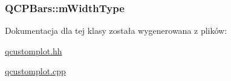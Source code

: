 \subsubsection[{\texorpdfstring{m\+Width\+Type}{mWidthType}}]{ Q\+C\+P\+Bars\+::m\+Width\+Type\hspace{0.3cm}{\ttfamily [protected]}}\hypertarget{class_q_c_p_bars_a94dba1309496c7601d01e2c59715cbb3}{}\label{class_q_c_p_bars_a94dba1309496c7601d01e2c59715cbb3}


Dokumentacja dla tej klasy została wygenerowana z plików\+:\begin{DoxyCompactItemize}
\item 
\hyperlink{qcustomplot_8hh}{qcustomplot.\+hh}\item 
\hyperlink{qcustomplot_8cpp}{qcustomplot.\+cpp}\end{DoxyCompactItemize}
